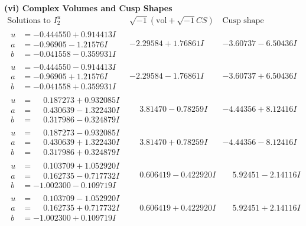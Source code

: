 \documentclass[1p]{elsarticle_modified}
\theoremstyle{definition}
\newcommand{\I}{\sqrt{-1}}
\begin{document}
\newpage\flushleft \textbf{(vi) Complex Volumes and Cusp Shapes}
$$\begin{array}{c|c|c}  
\text{Solutions to }I^u_{2}& \I (\text{vol} + \sqrt{-1}CS) & \text{Cusp shape}\\
 \hline 
\begin{aligned}
u &= -0.444550 + 0.914413 I \\
a &= -0.96905 - 1.21576 I \\
b &= -0.041558 - 0.359931 I\end{aligned}
 & -2.29584 + 1.76861 I & -3.60737 - 6.50436 I \\ \hline\begin{aligned}
u &= -0.444550 - 0.914413 I \\
a &= -0.96905 + 1.21576 I \\
b &= -0.041558 + 0.359931 I\end{aligned}
 & -2.29584 - 1.76861 I & -3.60737 + 6.50436 I \\ \hline\begin{aligned}
u &= \phantom{-}0.187273 + 0.932085 I \\
a &= \phantom{-}0.430639 - 1.322430 I \\
b &= \phantom{-}0.317986 - 0.324879 I\end{aligned}
 & \phantom{-}3.81470 - 0.78259 I & -4.44356 + 8.12416 I \\ \hline\begin{aligned}
u &= \phantom{-}0.187273 - 0.932085 I \\
a &= \phantom{-}0.430639 + 1.322430 I \\
b &= \phantom{-}0.317986 + 0.324879 I\end{aligned}
 & \phantom{-}3.81470 + 0.78259 I & -4.44356 - 8.12416 I \\ \hline\begin{aligned}
u &= \phantom{-}0.103709 + 1.052920 I \\
a &= \phantom{-}0.162735 - 0.717732 I \\
b &= -1.002300 - 0.109719 I\end{aligned}
 & \phantom{-}0.606419 - 0.422920 I & \phantom{-}5.92451 - 2.14116 I \\ \hline\begin{aligned}
u &= \phantom{-}0.103709 - 1.052920 I \\
a &= \phantom{-}0.162735 + 0.717732 I \\
b &= -1.002300 + 0.109719 I\end{aligned}
 & \phantom{-}0.606419 + 0.422920 I & \phantom{-}5.92451 + 2.14116 I \\ \hline\begin{aligned}

\end{aligned}
\end{array}$$
\end{document}
